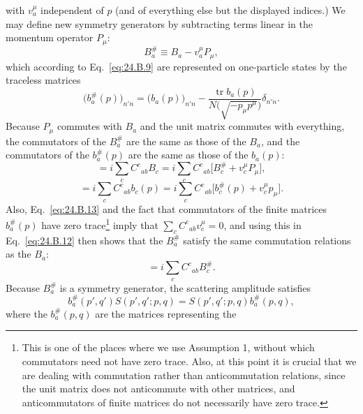 with $v_a^\mu$ independent of $p$ (and of everything else but the
displayed indices.) We may define new symmetry generators by subtracting terms
linear in the momentum operator $P_\mu$:
\begin{equation}
 B_a^\#\equiv B_a-v_a^\mu P_\mu,
\tag{24.B.10}\label{eq:24.B.10}
\end{equation}
which according to Eq.~\eqref{eq:24.B.9} are represented on one-particle
states by the traceless matrices
\begin{equation}
 \bigl(b_a^\#(p)\bigr)_{n'n}
 =\bigl(b_a(p)\bigr)_{n'n}
 -\frac{\operatorname{tr}b_a(p)}
 {N\bigl(\sqrt{-p_\mu p^\mu}\bigr)}\delta_{n'n}.
\tag{24.B.11}\label{eq:24.B.11}
\end{equation}
Because $P_\mu$ commutes with $B_a$ and the unit matrix commutes with
everything, the commutators of the $B_a^\#$ are the same as those of the
$B_a$, and the commutators of the $b_a^\#(p)$ are the same as those
of the $b_a(p)$:
\begin{equation}
 [B_a^\#,B_b^\#]
 =i\sum_c C^c{}_{ab}B_c
 =i\sum_c C^c{}_{ab}
 \bigl[B_c^\#+v_c^\mu P_\mu\bigr],
\tag{24.B.12}\label{eq:24.B.12}
\end{equation}
\begin{equation}
 [b_a^\#(p),b_b^\#(p)]
 =i\sum_c C^c{}_{ab}b_c(p)
 =i\sum_c C^c{}_{ab}
 \bigl[b_c^\#(p)+v_c^\mu p_\mu\bigr].
\tag{24.B.13}\label{eq:24.B.13}
\end{equation}
Also, Eq.~\eqref{eq:24.B.13} and the fact that commutators of the finite
matrices $b_a^\#(p)$ have zero trace\footnote{This is one of the places
where we use Assumption 1, without which commutators need not have zero trace.
Also, at this point it is crucial that we are dealing with commutation rather
than anticommutation relations, since the unit matrix does not anticommute with
other matrices, and anticommutators of finite matrices do not necessarily have
zero trace.} imply that
$\sum_c C^c{}_{ab}v_c^\mu=0$, and using this in
Eq.~\eqref{eq:24.B.12} then shows that the $B_a^\#$ satisfy the same
commutation relations as the $B_a$:
\begin{equation}
 [B_a^\#,B_b^\#]
 =i\sum_c C^c{}_{ab}B_c^\#.
\tag{24.B.14}\label{eq:24.B.14}
\end{equation}
Because $B_a^\#$ is a symmetry generator, the scattering amplitude
satisfies
\begin{equation}
 b_a^\#(p',q')S(p',q';p,q)
 =S(p',q';p,q)b_a^\#(p,q),
\tag{24.B.15}\label{eq:24.B.15}
\end{equation}
where the $b_a^\#(p,q)$ are the matrices representing the
